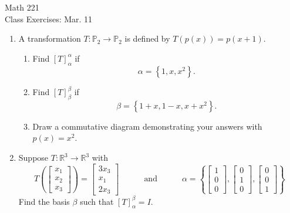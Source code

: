 \documentclass[11pt]{article}
\begin{document}
\begin{center}
\Large
\rm{Math 221}
\\
\rm{Class Exercises:  Mar. 11}
\\
\end{center}
\vspace{0.2in}

\begin{enumerate}
	\item{ 
A transformation $T:\mathbb{P}_{2}\to\mathbb{P}_{2}$ is defined by $T(p(x))=p(x+1)$. 

\begin{enumerate}
	\item {Find $[T]_{\alpha}^{\alpha}$ if
\begin{displaymath}
\alpha = \left\{1, x, x^2\right\}.
\end{displaymath}	
}
	\item {Find $[T]_{\beta}^{\beta}$ if
	\begin{displaymath}
	\beta = \left\{1+x, 1-x, x+x^2 \right\}.
	\end{displaymath}	
}
\item{Draw a commutative diagram demonstrating your answers with $p(x)=x^2$.}
\end{enumerate}
}

\vspace{1in}

\item{Suppose $T:\mathbb{R}^3\to\mathbb{R}^3$ with 
	\begin{displaymath}
	T\left(\left[ \begin{array}{r} x_1 \\ x_2 \\ x_3 \end{array} \right] \right) =  \left[ \begin{array}{c} 3x_3 \\ x_1 \\ 2x_3 \end{array} \right] \quad \quad \quad 
	\textrm{and}
	\quad\quad\quad
	\alpha = \left\{
	\left[ \begin{array}{r} 1 \\ 0 \\ 0   \end{array}\right],
	\left[ \begin{array}{r} 0 \\ 1 \\ 0  \end{array}\right],
	\left[ \begin{array}{r} 0 \\ 0 \\ 1  \end{array}\right]
	\right\}
	\end{displaymath}
Find the basis $\beta$ such that $[T]_{\alpha}^{\beta} = I$.
}
\end{enumerate}
\end{document}
